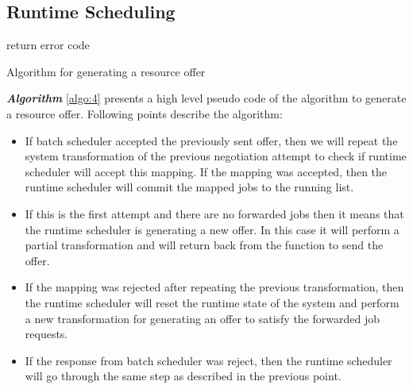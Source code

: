 \subsection{Runtime Scheduling}
\begin{algorithm}[!t]
 \DontPrintSemicolon
 return error code\;
 \caption{Algorithm for generating a resource offer}
 \label{algo:4}
\end{algorithm}
\textbf{\textit{Algorithm }}\ref{algo:4} presents a high level pseudo code of the algorithm to generate a resource offer. Following points describe the algorithm:
\begin{itemize}
\item If batch scheduler accepted the previously sent offer, then we will repeat the system transformation of the previous negotiation attempt to check if runtime scheduler will accept this mapping. If the mapping was accepted, then the runtime scheduler will commit the mapped jobs to the running list. 
\item If this is the first attempt and there are no forwarded jobs then it means that the runtime scheduler is generating a new offer. In this case it will perform a partial transformation and will return back from the function to send the offer.
\item If the mapping was rejected after repeating the previous transformation, then the runtime scheduler will reset the runtime state of the system and perform a new transformation for generating an offer to satisfy the forwarded job requests.
\item If the response from batch scheduler was reject, then the runtime scheduler will go through the same step as described in the previous point.
\end{itemize}
